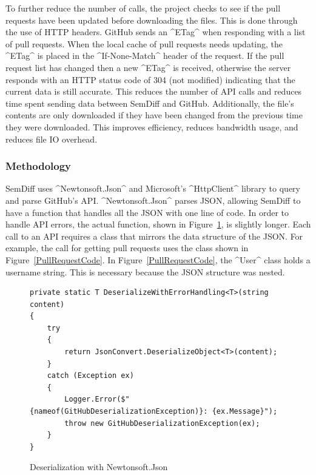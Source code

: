 \documentclass[draftclsnofoot,onecolumn]{IEEEtran}
\begin{document}
To further reduce the number of calls, the project checks to see if the pull 
requests have been updated before downloading the files. This is done through 
the use of HTTP headers. GitHub sends an ^ETag^ when responding with a list of 
pull requests. When the local cache of pull requests needs updating, the ^ETag^ 
is placed in the ^If-None-Match^ header of the request. If the pull request 
list has changed then a new ^ETag^ is received, otherwise the server responds 
with an HTTP status code of 304 (not modified) indicating that the current 
data is still accurate. This reduces the number of API calls and reduces time 
spent sending data between SemDiff and GitHub. Additionally, the file's contents 
are only downloaded if they have been changed from the previous time 
they were downloaded. This improves efficiency, reduces bandwidth usage, and 
reduces file IO overhead. 

\subsubsection{Methodology}

SemDiff uses ^Newtonsoft.Json^ and Microsoft's ^HttpClient^ library to query 
and parse GitHub's API. ^Newtonsoft.Json^ parses JSON, allowing SemDiff to 
have a function that handles all the JSON with one line of code. In order to 
handle API errors, the actual function, shown in 
Figure~\ref{deserializeNewtonsoft}, is slightly longer. Each call to an API 
requires a class that mirrors the data structure of the JSON. For example, the 
call for getting pull requests uses the class shown in 
Figure~\ref{PullRequestCode}. In Figure~\ref{PullRequestCode}, the ^User^ 
class holds a username string. This is necessary because the JSON structure 
was nested.

\begin{figure}[!htb]
\centering
\begin{lstlisting}
private static T DeserializeWithErrorHandling<T>(string content)
{
    try
    {
        return JsonConvert.DeserializeObject<T>(content);
    }
    catch (Exception ex)
    {
        Logger.Error($"{nameof(GitHubDeserializationException)}: {ex.Message}");
        throw new GitHubDeserializationException(ex);
  	}
}
\end{lstlisting}
\caption{Deserialization with Newtonsoft.Json}
\label{deserializeNewtonsoft}
\end{figure}
\end{document}
